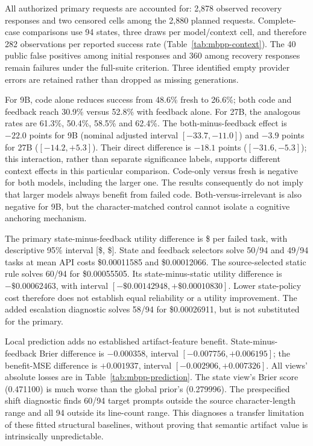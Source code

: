 \documentclass[10pt,twocolumn]{article}
\begin{document}
All authorized primary requests are accounted for: 2,878 observed recovery
responses and two censored cells among the 2,880 planned requests. Complete-case
comparisons use 94 states, three draws per model/context cell, and therefore
282 observations per reported success rate (Table~\ref{tab:mbpp-context}). The
40 public false positives among initial responses and 360 among recovery
responses remain failures under the full-suite criterion. Three identified
empty provider errors are retained rather than dropped as missing generations.

For 9B, code alone reduces success from 48.6\% fresh to 26.6\%; both code and
feedback reach 30.9\% versus 52.8\% with feedback alone. For 27B, the analogous
rates are 61.3\%, 50.4\%, 58.5\% and 62.4\%. The both-minus-feedback effect is
$-22.0$ points for 9B (nominal adjusted interval $[-33.7,-11.0]$) and $-3.9$
points for 27B ($[-14.2,+5.3]$). Their direct difference is $-18.1$ points
($[-31.6,-5.3]$); this interaction, rather than separate significance labels,
supports different context effects in this particular comparison.
Code-only versus fresh is negative for both models, including the larger one.
The results consequently do not imply that larger models always benefit from
failed code. Both-versus-irrelevant is also negative for 9B, but the
character-matched control cannot isolate a cognitive anchoring mechanism.

The primary state-minus-feedback utility difference is
\$\PrimaryEstimate{} per failed task, with descriptive 95\% interval
[\$\PrimaryLow, \$\PrimaryHigh]. State and feedback selectors solve 50/94 and
49/94 tasks at mean API costs \$0.00011585 and \$0.00012066. The source-selected
static rule solves 60/94 for \$0.00055505. Its state-minus-static utility
difference is $-\$0.00062463$, with interval
$[-\$0.00142948,+\$0.00010830]$. Lower state-policy cost therefore does not
establish equal reliability or a utility improvement. The added escalation
diagnostic solves 58/94 for \$0.00026911, but is not substituted for the primary.

Local prediction adds no established artifact-feature benefit. State-minus-
feedback Brier difference is $-0.000358$, interval $[-0.007756,+0.006195]$;
the benefit-MSE difference is $+0.001937$, interval $[-0.002906,+0.007326]$.
All views' absolute losses are in Table~\ref{tab:mbpp-prediction}. The state
view's Brier score (0.471100) is much worse than the global prior's (0.279996).
The prespecified shift diagnostic finds 60/94 target prompts outside the source
character-length range and all 94 outside its line-count range. This diagnoses
a transfer limitation of these fitted structural baselines, without proving
that semantic artifact value is intrinsically unpredictable.
\end{document}
